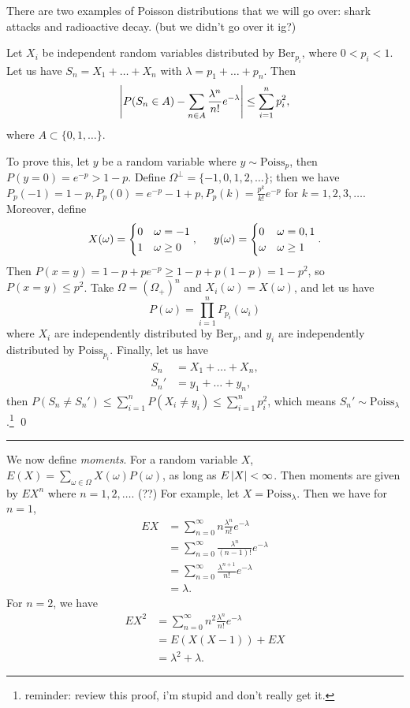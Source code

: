 \newpage
\noindent There are two examples of Poisson distributions that we will go over: shark attacks and radioactive decay. (but we didn't go over it ig?)
\begin{simplethm}[Doeblin]
    Let $X_i$ be independent random variables distributed by $\mathrm{Ber}_{p_i}$, where $0 < p_i < 1$. Let us have $S_n = X_1 + \dots + X_n$ with $\lambda = p_1 + \dots + p_n$. Then
    \[ \left\lvert P(S_n \in A) - \sum_{n \in A} \frac{\lambda^n}{n!} e^{-\lambda} \right\rvert \leq \sum_{i=1}^n p_i^2, \]
    where $A \subset \{0, 1, \dots\}$.
\end{simplethm}
\noindent To prove this, let $y$ be a random variable where $y \sim \mathrm{Poiss}_p$, then $P(y = 0) = e^{-p} > 1 - p$. Define $\Omega^{\perp} = \{-1, 0, 1, 2, \dots\}$; then we have $P_p(-1) = 1 - p, P_p(0) = e^{-p} - 1 + p, P_p(k) = \frac{p^k}{k!} e^{-p}$ for $k = 1, 2, 3, \dots$. Moreover, define
\[ X(\omega) = \begin{cases} 0 & \omega = -1 \\ 1 & \omega \geq 0 \end{cases}, \hspace{0.2in} y(\omega) = \begin{cases} 0 & \omega = 0, 1 \\ \omega & \omega \geq 1 \end{cases}. \]
Then $P(x = y) = 1 - p + pe^{-p} \geq 1 - p + p(1 - p) = 1 - p^2$, so $P(x = y) \leq p^2$. Take $\Omega = (\Omega_+)^n$ and $X_i(\omega) = X(\omega)$, and let us have
\[ P(\omega) = \prod_{i=1}^n P_{p_i} (\omega_i) \]
where $X_i$ are independently distributed by $\mathrm{Ber}_p$, and $y_i$ are independently distributed by $\mathrm{Poiss}_{p_i}$. Finally, let us have
\begin{align*}
    S_n &= X_1 + \dots + X_n, \\
    S_n' &= y_1 + \dots + y_n,
\end{align*}
then $P(S_n \neq S_n') \leq \sum_{i=1}^n P(X_i \neq y_i) \leq \sum_{i=1}^n p_i^2$, which means $S_n' \sim \mathrm{Poiss}_\lambda$.\footnote{reminder: review this proof, i'm stupid and don't really get it.} \qed
\bigskip\hrule\bigskip
\noindent We now define \textit{moments}. For a random variable $X$, $E(X) = \sum_{\omega \in \Omega} X(\omega) P(\omega)$, as long as $E\left\lvert X \right\rvert < \infty$. Then moments are given by $EX^n$ where $n = 1, 2, \dots.$ (??) For example, let $X = \mathrm{Poiss}_\lambda$. Then we have for $n = 1$,
\begin{align*}
    EX &= \sum_{n=0}^\infty n \frac{\lambda^n}{n!} e^{-\lambda} \\
    &= \sum_{n=0}^\infty \frac{\lambda^n}{(n - 1)!} e^{-\lambda} \\
    &= \sum_{n=0}^\infty \frac{\lambda^{n+1}}{n!} e^{-\lambda} \\
    &= \lambda.
\end{align*}
For $n = 2$, we have
\begin{align*}
    EX^2 &= \sum_{n=0}^\infty n^2 \frac{\lambda^n}{n!} e^{-\lambda} \\
    &= E(X(X - 1)) + EX \\
    &= \lambda^2 + \lambda.
\end{align*}